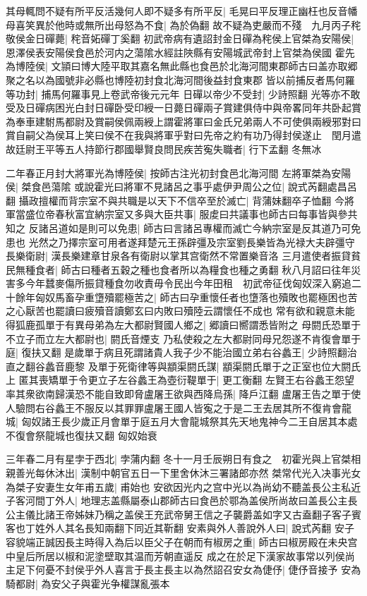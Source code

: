 其母輒問不疑有所平反活幾何人即不疑多有所平反|{
	毛晃曰平反理正幽枉也反音幡}
母喜笑異於他時或無所出母怒為不食|{
	為於偽翻}
故不疑為吏嚴而不殘　九月丙子秺敬侯金日磾薨|{
	秺音妬磾丁奚翻}
初武帝病有遺詔封金日磾為秺侯上官桀為安陽侯|{
	恩澤侯表安陽侯食邑於河内之蕩隂水經註陜縣有安陽城武帝封上官桀為侯國}
霍先為博陸侯|{
	文頴曰博大陸平取其嘉名無此縣也食邑於北海河間東郡師古曰盖亦取郷聚之名以為國號非必縣也博陸初封食北海河間後益封食東郡}
皆以前捕反者馬何羅等功封|{
	捕馬何羅事見上卷武帝後元元年}
日磾以帝少不受封|{
	少詩照翻}
光等亦不敢受及日磾病困光白封日磾卧受印綬一日薨日磾兩子賞建俱侍中與帝畧同年共卧起賞為奉車建駙馬都尉及賞嗣侯佩兩綬上謂霍將軍曰金氏兄弟兩人不可使俱兩綬邪對曰賞自嗣父為侯耳上笑曰侯不在我與將軍乎對曰先帝之約有功乃得封侯遂止　閏月遣故廷尉王平等五人持節行郡國舉賢良問民疾苦寃失職者|{
	行下孟翻}
冬無冰

二年春正月封大將軍光為博陸侯|{
	按師古注光初封食邑北海河間}
左將軍桀為安陽侯|{
	桀食邑蕩隂}
或說霍光曰將軍不見諸呂之事乎處伊尹周公之位|{
	說式芮翻處昌呂翻}
攝政擅權而背宗室不與共職是以天下不信卒至於滅亡|{
	背蒲妹翻卒子恤翻}
今將軍當盛位帝春秋富宜納宗室又多與大臣共事|{
	服䖍曰共議事也師古曰每事皆與參共知之}
反諸呂道如是則可以免患|{
	師古曰言諸呂專權而滅亡今納宗室是反其道乃可免患也}
光然之乃擇宗室可用者遂拜楚元王孫辟彊及宗室劉長樂皆為光禄大夫辟彊守長樂衛尉|{
	漢長樂建章甘泉各有衛尉以掌其宫衛然不常置樂音洛}
三月遣使者振貸貧民無種食者|{
	師古曰種者五穀之種也食者所以為糧食也種之勇翻}
秋八月詔曰往年災害多今年蠺麥傷所振貸種食勿收責毋令民出今年田租　初武帝征伐匈奴深入窮追二十餘年匈奴馬畜孕重墯殰罷極苦之|{
	師古曰孕重懷任者也墯落也殰敗也罷極困也苦之心厭苦也罷讀曰疲殰音讀鄭玄曰内敗曰殰陸云謂懷任不成也}
常有欲和親意未能得狐鹿孤單于有異母弟為左大都尉賢國人鄉之|{
	郷讀曰嚮謂悉皆附之}
母閼氏恐單于不立子而立左大都尉也|{
	閼氏音煙支}
乃私使殺之左大都尉同母兄怨遂不肯復會單于庭|{
	復扶又翻}
是歲單于病且死謂諸貴人我子少不能治國立弟右谷蠡王|{
	少詩照翻治直之翻谷蠡音鹿黎}
及單于死衛律等與顓渠閼氏謀|{
	顓渠閼氏單于之正室也位大閼氏上}
匿其喪矯單于令更立子左谷蠡王為壺衍鞮單于|{
	更工衡翻}
左賢王右谷蠡王怨望率其衆欲南歸漢恐不能自致即脅盧屠王欲與西降烏孫|{
	降戶江翻}
盧屠王告之單于使人驗問右谷蠡王不服反以其罪罪盧屠王國人皆寃之于是二王去居其所不復肯會龍城|{
	匈奴諸王長少歲正月會單于庭五月大會龍城祭其先天地鬼神今二王自居其本處不復會祭龍城也復扶又翻}
匈奴始衰

三年春二月有星孛于西北|{
	孛蒲内翻}
冬十一月壬辰朔日有食之　初霍光與上官桀相親善光每休沐出|{
	漢制中朝官五日一下里舍休沐三署諸郎亦然}
桀常代光入决事光女為桀子安妻生女年甫五歲|{
	甫始也}
安欲因光内之宫中光以為尚幼不聽盖長公主私近子客河間丁外人|{
	地理志盖縣屬泰山郡師古曰食邑於鄂為盖侯所尚故曰盖長公主長公主儀比諸王帝姊妹乃稱之盖侯王充武帝舅王信之子襲爵盖如字又古盍翻子客子賓客也丁姓外人其名長知兩翻下同近其靳翻}
安素與外人善說外人曰|{
	說式芮翻}
安子容貌端正誠因長主時得入為后以臣父子在朝而有椒房之重|{
	師古曰椒房殿在未央宫中皇后所居以椒和泥塗壁取其温而芳朝直遥反}
成之在於足下漢家故事常以列侯尚主足下何憂不封侯乎外人喜言于長主長主以為然詔召安女為倢伃|{
	倢伃音接予}
安為騎都尉|{
	為安父子與霍光争權謀亂張本}


